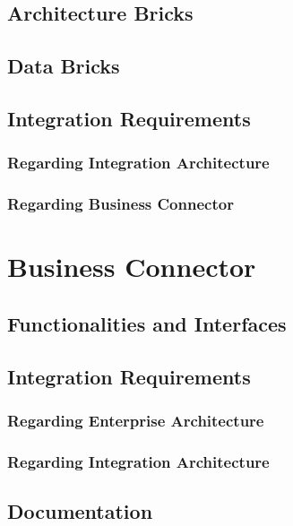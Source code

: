 \documentclass[
     12pt,         %
     a4paper,      %
     BCOR10mm,     %
     DIV14,        %
aragraph skip instad of paragraph indent
     ]{scrreprt}
\begin{document}
\subsection{Architecture Bricks}

\subsection{Data Bricks}

\subsection{Integration Requirements}

\subsubsection{Regarding Integration Architecture}

\subsubsection{Regarding Business Connector}



\section{Business Connector}

\subsection{Functionalities and Interfaces}

\subsection{Integration Requirements}

\subsubsection{Regarding Enterprise Architecture}

\subsubsection{Regarding Integration Architecture}

\subsection{Documentation}
\end{document}
